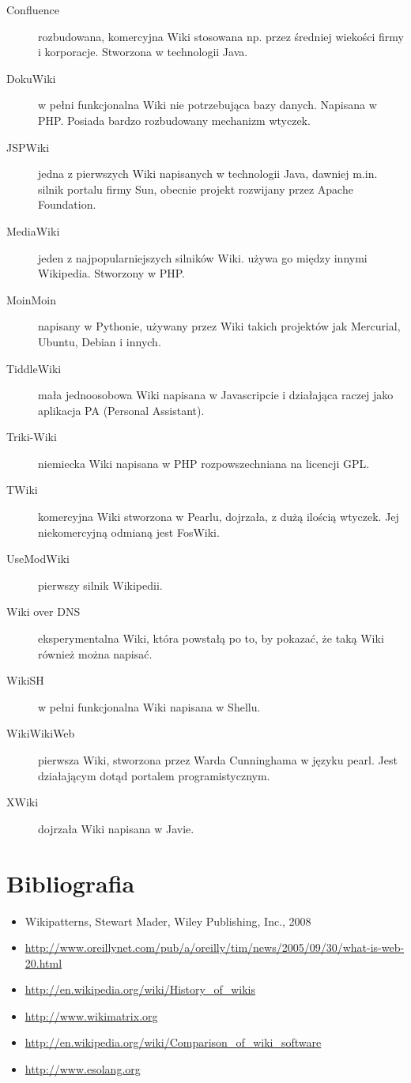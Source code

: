 \documentclass{article}
\begin{document}
\begin{description}
	\item[Confluence] rozbudowana, komercyjna Wiki stosowana np. przez średniej wiekości firmy i korporacje. Stworzona w technologii Java.  
	\item[DokuWiki] w pełni funkcjonalna Wiki nie potrzebująca bazy danych. Napisana w PHP. Posiada bardzo rozbudowany mechanizm wtyczek.
	\item[JSPWiki] jedna z pierwszych Wiki napisanych w technologii Java, dawniej m.in. silnik portalu firmy Sun, obecnie projekt rozwijany przez Apache Foundation. 
	\item[MediaWiki] jeden z najpopularniejszych silników Wiki. używa go między innymi Wikipedia. Stworzony w PHP.
	\item[MoinMoin] napisany w Pythonie, używany przez Wiki takich projektów jak Mercurial, Ubuntu, Debian i innych.
	\item[TiddleWiki] mała jednoosobowa Wiki napisana w Javascripcie i działająca raczej jako aplikacja PA (Personal Assistant).
	\item[Triki-Wiki] niemiecka Wiki napisana w PHP rozpowszechniana na licencji GPL. 
	\item[TWiki] komercyjna Wiki stworzona w Pearlu, dojrzała, z dużą ilością wtyczek. Jej niekomercyjną odmianą jest FosWiki.
	\item[UseModWiki] pierwszy silnik Wikipedii.
	\item[Wiki over DNS] eksperymentalna Wiki, która powstałą po to, by pokazać, że taką Wiki również można napisać.
	\item[WikiSH] w pełni funkcjonalna Wiki napisana w Shellu.
	\item[WikiWikiWeb] pierwsza Wiki, stworzona przez Warda Cunninghama w języku pearl. Jest działającym dotąd portalem programistycznym. 
	\item[XWiki] dojrzała Wiki napisana w Javie.
\end{description}


\newpage
\section{Bibliografia}
	\begin{itemize}
		\item 	Wikipatterns, Stewart Mader, Wiley Publishing, Inc., 2008
 		\item \url{http://www.oreillynet.com/pub/a/oreilly/tim/news/2005/09/30/what-is-web-20.html}
		\item \url{http://en.wikipedia.org/wiki/History_of_wikis}
		\item \url{http://www.wikimatrix.org}
		\item \url{http://en.wikipedia.org/wiki/Comparison_of_wiki_software}
		\item \url{http://www.esolang.org}
	\end{itemize}
\end{document}
